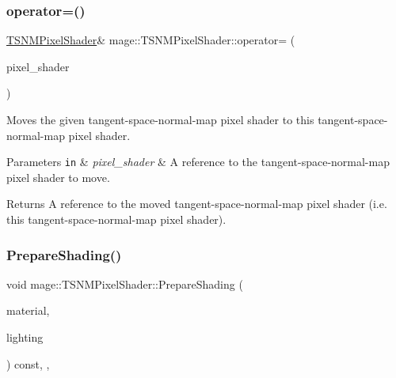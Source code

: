 \subsubsection{\texorpdfstring{operator=()}{operator=()}\hspace{0.1cm}{\footnotesize\ttfamily [2/2]}}
{\footnotesize\ttfamily \hyperlink{classmage_1_1_t_s_n_m_pixel_shader}{T\+S\+N\+M\+Pixel\+Shader}\& mage\+::\+T\+S\+N\+M\+Pixel\+Shader\+::operator= (\begin{DoxyParamCaption}\item[{\hyperlink{classmage_1_1_t_s_n_m_pixel_shader}{T\+S\+N\+M\+Pixel\+Shader} \&\&}]{pixel\+\_\+shader }\end{DoxyParamCaption})\hspace{0.3cm}{\ttfamily [delete]}}

Moves the given tangent-\/space-\/normal-\/map pixel shader to this tangent-\/space-\/normal-\/map pixel shader.


\begin{DoxyParams}[1]{Parameters}
\mbox{\tt in}  & {\em pixel\+\_\+shader} & A reference to the tangent-\/space-\/normal-\/map pixel shader to move. \\
\hline
\end{DoxyParams}
\begin{DoxyReturn}{Returns}
A reference to the moved tangent-\/space-\/normal-\/map pixel shader (i.\+e. this tangent-\/space-\/normal-\/map pixel shader). 
\end{DoxyReturn}
\hypertarget{classmage_1_1_t_s_n_m_pixel_shader_abe01a4e6007a0a1ca98ed8fe48523138}{}\label{classmage_1_1_t_s_n_m_pixel_shader_abe01a4e6007a0a1ca98ed8fe48523138} 
\subsubsection{\texorpdfstring{Prepare\+Shading()}{PrepareShading()}}
{\footnotesize\ttfamily void mage\+::\+T\+S\+N\+M\+Pixel\+Shader\+::\+Prepare\+Shading (\begin{DoxyParamCaption}\item[{const \hyperlink{structmage_1_1_material}{Material} \&}]{material,  }\item[{const \hyperlink{structmage_1_1_lighting}{Lighting} \&}]{lighting }\end{DoxyParamCaption}) const\hspace{0.3cm}{\ttfamily [final]}, {\ttfamily [override]}, {\ttfamily [virtual]}}

